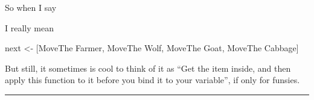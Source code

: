 \documentclass[]{article}
\newenvironment{Shaded}{}{}
\newcommand{\DataTypeTok}[1]{\textcolor[rgb]{0.56,0.13,0.00}{#1}}
\newcommand{\DecValTok}[1]{\textcolor[rgb]{0.25,0.63,0.44}{#1}}
\newcommand{\FunctionTok}[1]{\textcolor[rgb]{0.02,0.16,0.49}{#1}}
\newcommand{\NormalTok}[1]{#1}
\newcommand{\OtherTok}[1]{\textcolor[rgb]{0.00,0.44,0.13}{#1}}
\begin{document}
\begin{Shaded}
\end{Shaded}

So when I say

\begin{Shaded}
\end{Shaded}

I really mean

\begin{Shaded}
\begin{Highlighting}[]
\NormalTok{next }\OtherTok{<-}\NormalTok{ [}\DataTypeTok{MoveThe} \DataTypeTok{Farmer}\NormalTok{, }\DataTypeTok{MoveThe} \DataTypeTok{Wolf}\NormalTok{, }\DataTypeTok{MoveThe} \DataTypeTok{Goat}\NormalTok{, }\DataTypeTok{MoveThe} \DataTypeTok{Cabbage}\NormalTok{]}
\end{Highlighting}
\end{Shaded}

But still, it sometimes is cool to think of it as ``Get the item inside, and
then apply this function to it before you bind it to your variable'', if only
for funsies.

\begin{center}\rule{0.5\linewidth}{\linethickness}\end{center}
\end{document}
